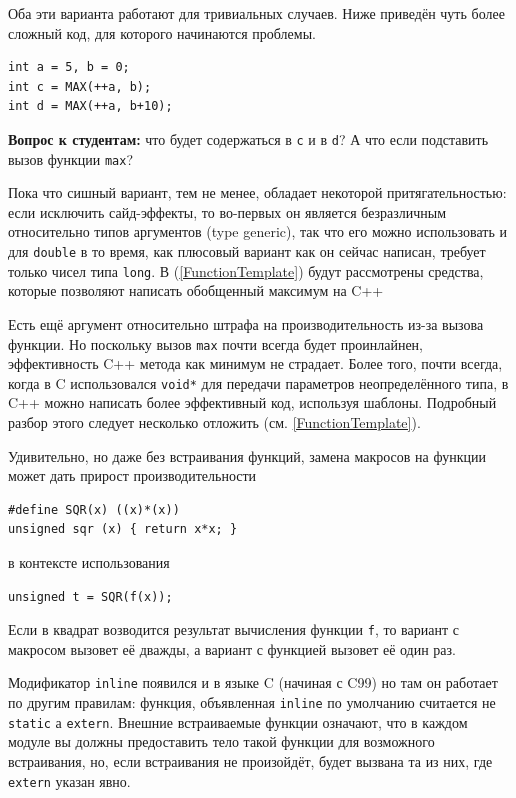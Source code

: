 \documentclass[a4paper,12pt,oneside]{article}
\newif\ifanswers
\begin{document}
Оба эти варианта работают для тривиальных случаев. Ниже приведён чуть более сложный код, для которого начинаются проблемы.

\begin{lstlisting}
int a = 5, b = 0;
int c = MAX(++a, b);
int d = MAX(++a, b+10);
\end{lstlisting}

\textbf{Вопрос к студентам:} что будет содержаться в \lstinline!c! и в \lstinline!d!? А что если подставить вызов функции \lstinline!max!? 

\ifanswers
Правильный ответ: макрос раскроется как \lstinline!((++a) > (b) ? (++a) : (b))! то есть в сишной версии \lstinline!a! будет инкрементирована дважды. В C++ версии всё норм.
\fi

Пока что сишный вариант, тем не менее, обладает некоторой притягательностью: если исключить сайд-эффекты, то во-первых он является безразличным относительно типов аргументов (type generic), так что его можно использовать и для \lstinline!double! в то время, как плюсовый вариант как он сейчас написан, требует только чисел типа \lstinline!long!. В (\ref{FunctionTemplate}) будут рассмотрены средства, которые позволяют написать обобщенный максимум на C++

Есть ещё аргумент относительно штрафа на производительность из-за вызова функции. Но поскольку вызов \lstinline!max! почти всегда будет проинлайнен, эффективность C++ метода как минимум не страдает. Более того, почти всегда, когда в C использовался \lstinline!void*! для передачи параметров неопределённого типа, в C++ можно написать более эффективный код, используя шаблоны. Подробный разбор этого следует несколько отложить (см. \ref{FunctionTemplate}).

Удивительно, но даже без встраивания функций, замена макросов на функции может дать прирост производительности

\begin{lstlisting}
#define SQR(x) ((x)*(x))
unsigned sqr (x) { return x*x; }
\end{lstlisting}

в контексте использования

\begin{lstlisting}
unsigned t = SQR(f(x));
\end{lstlisting}

Если в квадрат возводится результат вычисления функции \lstinline!f!, то вариант с макросом вызовет её дважды, а вариант с функцией вызовет её один раз.

Модификатор \lstinline!inline! появился и в языке C (начиная с C99) но там он работает по другим правилам: функция, объявленная \lstinline!inline! по умолчанию считается не \lstinline!static! а \lstinline!extern!. Внешние встраиваемые функции означают, что в каждом модуле вы должны предоставить тело такой функции для возможного встраивания, но, если встраивания не произойдёт, будет вызвана та из них, где \lstinline!extern! указан явно.
\end{document}
